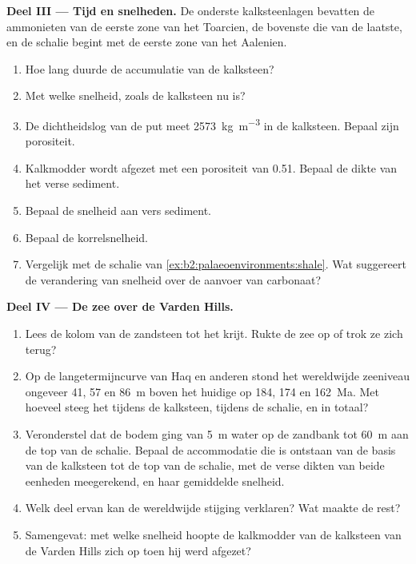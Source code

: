 \begin{problem}
\medskip\noindent\textbf{Deel III --- Tijd en snelheden.} De onderste kalksteenlagen bevatten de
ammonieten van de eerste zone van het Toarcien, de bovenste die van de laatste, en de schalie begint met
de eerste zone van het Aalenien.
\begin{enumerate}[resume]
  \item Hoe lang duurde de accumulatie van de kalksteen?
  \item Met welke snelheid, zoals de kalksteen nu is?
  \item De dichtheidslog van de put meet \qty{2573}{kg.m^{-3}} in de kalksteen. Bepaal zijn
        porositeit.
  \item Kalkmodder wordt afgezet met een porositeit van 0.51. Bepaal de dikte van het verse sediment.
  \item Bepaal de snelheid aan vers sediment.
  \item Bepaal de korrelsnelheid.
  \item Vergelijk met de schalie van \cref{ex:b2:palaeoenvironments:shale}. Wat suggereert de verandering van
        snelheid over de aanvoer van carbonaat?
\end{enumerate}

\medskip\noindent\textbf{Deel IV --- De zee over de Varden Hills.}
\begin{enumerate}[resume]
  \item Lees de kolom van de zandsteen tot het krijt. Rukte de zee op of trok ze zich terug?
  \item Op de langetermijncurve van Haq en anderen stond het wereldwijde zeeniveau ongeveer 41, 57 en
        \qty{86}{m} boven het huidige op 184, 174 en \qty{162}{Ma}. Met hoeveel steeg het tijdens de
        kalksteen, tijdens de schalie, en in totaal?
  \item Veronderstel dat de bodem ging van \qty{5}{m} water op de zandbank tot \qty{60}{m} aan de top van
        de schalie. Bepaal de accommodatie die is ontstaan van de basis van de kalksteen tot de top van de
        schalie, met de verse dikten van beide eenheden meegerekend, en haar gemiddelde snelheid.
  \item Welk deel ervan kan de wereldwijde stijging verklaren? Wat maakte de rest?
  \item Samengevat: met welke snelheid hoopte de kalkmodder van de kalksteen van de Varden Hills zich op toen hij
        werd afgezet?
\end{enumerate}
\end{problem}
